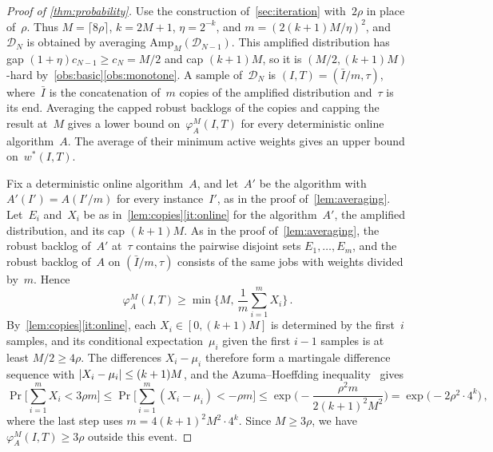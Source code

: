 \documentclass[11pt,letterpaper]{article}
\theoremstyle{definition}
\theoremstyle{remark}
\DeclarePairedDelimiter{\abs}{\lvert}{\rvert}
\newcommand{\cD}{\mathcal{D}}
\newcommand{\Amp}{\mathrm{Amp}}
\begin{document}
\begin{proof}[Proof of \cref{thm:probability}]
Use the construction of~\cref{sec:iteration} with~$2\rho$ in place of~$\rho$. Thus $M=\lceil8\rho\rceil$, $k=2M+1$, $\eta=2^{-k}$, and $m=(2(k+1)M/\eta)^2$, and~$\cD_N$ is obtained by averaging $\Amp_M(\cD_{N-1})$. This amplified distribution has gap $(1+\eta)c_{N-1}\ge c_N=M/2$ and cap $(k+1)M$, so it is $(M/2,(k+1)M)$-hard by~\cref{obs:basic}\ref{obs:monotone}. A sample of~$\cD_N$ is $(I,T)=(\bar I/m,\tau)$, where~$\bar I$ is the concatenation of~$m$ copies of the amplified distribution and~$\tau$ is its end. Averaging the capped robust backlogs of the copies and capping the result at~$M$ gives a lower bound on~$\varphi_A^M(I,T)$ for every deterministic online algorithm~$A$. The average of their minimum active weights gives an upper bound on~$w^*(I,T)$.

Fix a deterministic online algorithm~$A$, and let~$A'$ be the algorithm with $A'(I')=A(I'/m)$ for every instance~$I'$, as in the proof of~\cref{lem:averaging}. Let~$E_i$ and~$X_i$ be as in~\cref{lem:copies}\ref{it:online} for the algorithm~$A'$, the amplified distribution, and its cap $(k+1)M$. As in the proof of~\cref{lem:averaging}, the robust backlog of~$A'$ at~$\tau$ contains the pairwise disjoint sets $E_1,\dots,E_m$, and the robust backlog of~$A$ on $(\bar I/m,\tau)$ consists of the same jobs with weights divided by~$m$. Hence
\begin{equation*}
  \varphi_A^M(I,T)\ge\min\biggl\{M,\,\frac1m\sum_{i=1}^mX_i\biggr\}\,.
\end{equation*}
By~\cref{lem:copies}\ref{it:online}, each $X_i\in[0,(k+1)M]$ is determined by the first~$i$ samples, and its conditional expectation~$\mu_i$ given the first $i-1$ samples is at least $M/2\ge4\rho$. The differences $X_i-\mu_i$ therefore form a martingale difference sequence with $\abs{X_i-\mu_i}\le(k+1)M$, and the Azuma--Hoeffding inequality~\cite{Azuma67,Hoeffding63} gives
\begin{equation*}
  \Pr\biggl[\sum_{i=1}^mX_i<3\rho m\biggr]
  \le\Pr\biggl[\sum_{i=1}^m(X_i-\mu_i)<-\rho m\biggr]
  \le\exp\biggl(-\frac{\rho^2m}{2(k+1)^2M^2}\biggr)
  =\exp\bigl(-2\rho^2\cdot4^k\bigr)\,,
\end{equation*}
where the last step uses $m=4(k+1)^2M^2\cdot4^k$. Since $M\ge3\rho$, we have $\varphi_A^M(I,T)\ge3\rho$ outside this event.


\end{proof}
\end{document}
